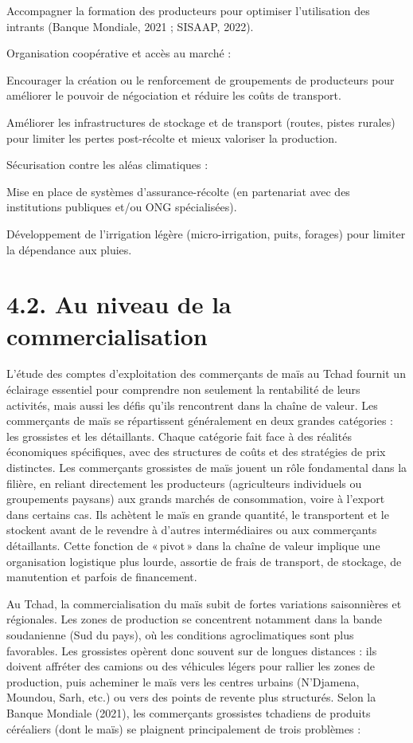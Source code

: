 \documentclass[12pt,oneside]{report}
\begin{document}
Accompagner la formation des producteurs pour optimiser l’utilisation des intrants (Banque Mondiale, 2021 ; SISAAP, 2022).

Organisation coopérative et accès au marché :

Encourager la création ou le renforcement de groupements de producteurs pour améliorer le pouvoir de négociation et réduire les coûts de transport.

Améliorer les infrastructures de stockage et de transport (routes, pistes rurales) pour limiter les pertes post-récolte et mieux valoriser la production.

Sécurisation contre les aléas climatiques :

Mise en place de systèmes d’assurance-récolte (en partenariat avec des institutions publiques et/ou ONG spécialisées).

Développement de l’irrigation légère (micro-irrigation, puits, forages) pour limiter la dépendance aux pluies.

\section{4.2. Au niveau de la commercialisation}
L’étude des comptes d’exploitation des commerçants de maïs au Tchad fournit un éclairage essentiel pour comprendre non seulement la rentabilité de leurs activités, mais aussi les défis qu’ils rencontrent dans la chaîne de valeur. Les commerçants de maïs se répartissent généralement en deux grandes catégories : les grossistes et les détaillants. Chaque catégorie fait face à des réalités économiques spécifiques, avec des structures de coûts et des stratégies de prix distinctes. Les commerçants grossistes de maïs jouent un rôle fondamental dans la filière, en reliant directement les producteurs (agriculteurs individuels ou groupements paysans) aux grands marchés de consommation, voire à l’export dans certains cas. Ils achètent le maïs en grande quantité, le transportent et le stockent avant de le revendre à d’autres intermédiaires ou aux commerçants détaillants. Cette fonction de « pivot » dans la chaîne de valeur implique une organisation logistique plus lourde, assortie de frais de transport, de stockage, de manutention et parfois de financement.

Au Tchad, la commercialisation du maïs subit de fortes variations saisonnières et régionales. Les zones de production se concentrent notamment dans la bande soudanienne (Sud du pays), où les conditions agroclimatiques sont plus favorables. Les grossistes opèrent donc souvent sur de longues distances : ils doivent affréter des camions ou des véhicules légers pour rallier les zones de production, puis acheminer le maïs vers les centres urbains (N’Djamena, Moundou, Sarh, etc.) ou vers des points de revente plus structurés. Selon la Banque Mondiale (2021), les commerçants grossistes tchadiens de produits céréaliers (dont le maïs) se plaignent principalement de trois problèmes :
\end{document}
